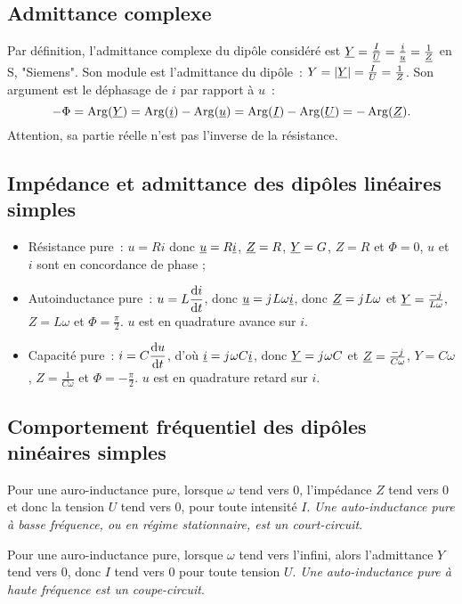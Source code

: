     \subsection{Admittance complexe}
        Par définition, l'admittance complexe du dipôle considéré est $\underline{Y} = \frac{\underline{I}}{\underline{U}}=\frac{\underline{i}}{\underline{u}}=\frac{1}{\underline{Z}}$ en $\si{\siemens}$, "Siemens". Son module est l'admittance du dipôle~: $Y = \left\lvert\underline{Y}\right\rvert = \frac{I}{U} = \frac{1}{Z}$. Son argument est le déphasage de $i$ par rapport à $u$~:
        \begin{equation}
            -\Phi = \operatorname{Arg}(\underline{Y}) = \operatorname{Arg}(\underline{i}) - \operatorname{Arg}(\underline{u}) = \operatorname{Arg}(\underline{I}) - \operatorname{Arg}(\underline{U}) = -\operatorname{Arg}(\underline{Z}).
        \end{equation}
        Attention, sa partie réelle n'est pas l'inverse de la résistance.
    \subsection{Impédance et admittance des dipôles linéaires simples}
        \begin{itemize}
            \item Résistance pure~: $u=Ri$ donc $\underline{u} = R \underline{i}$, $\underline{Z} =R$, $\underline{Y} = G$, $Z=R$ et $\Phi=0$, $u$ et $i$ sont en concordance de phase ;
            \item Autoinductance pure~: $u=L\dfrac{\mathrm{d} i}{\mathrm{d} t}$, donc $\underline{u} = {j\mkern1mu} L \omega \underline{i}$, donc $\underline{Z} = {j\mkern1mu} L\omega$ et $\underline{Y} = \frac{-{j\mkern1mu}}{L\omega},$ $Z=L\omega$ et $\Phi=\frac{\pi}{2}$. $u$ est en quadrature avance sur $i$.
            \item Capacité pure~: $i=C\dfrac{\mathrm{d} u}{\mathrm{d} t}$, d'où $\underline{i} = {j\mkern1mu}\omega C \underline{i}$, donc $\underline{Y} = {j\mkern1mu}\omega C$ et $\underline{Z} = \frac{-{j\mkern1mu}}{C\omega}$, $Y=C\omega$, $Z=\frac{1}{C\omega}$ et $\Phi = -\frac{\pi}{2}$. $u$ est en quadrature retard sur $i$.
        \end{itemize}
    \subsection{Comportement fréquentiel des dipôles ninéaires simples}
        Pour une auro-inductance pure, lorsque $\omega$ tend vers 0, l'impédance $Z$ tend vers 0 et donc la tension $U$ tend vers 0, pour toute intensité $I$. \emph{Une auto-inductance pure à basse fréquence, ou en régime stationnaire, est un court-circuit}.

        Pour une auro-inductance pure, lorsque $\omega$ tend vers l'infini, alors l'admittance $Y$ tend vers 0, donc $I$ tend vers 0 pour toute tension $U$. \emph{Une auto-inductance pure à haute fréquence est un coupe-circuit}.

